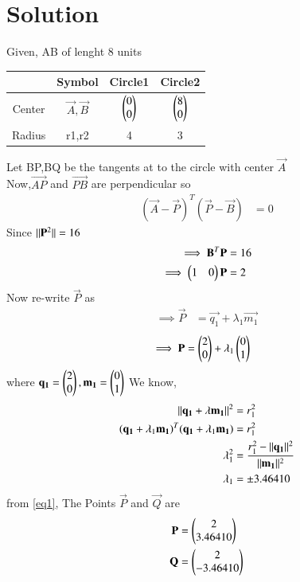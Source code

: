 \documentclass[journal,12pt,twocolumn]{IEEEtran}
\begin{document}
\section*{Solution}
Given, AB of lenght 8 units 
\begin{center}
\begin{tabular}{|c|c|c|c|}
  \hline
  & Symbol & Circle1 & Circle2 \\
  \hline
  Center & $\Vec{A},\Vec{B}$ & $\begin{pmatrix}0\\0\end{pmatrix}$ & $\begin{pmatrix}8\\0\end{pmatrix}$ \\ 
  \hline
  Radius & r1,r2 & 4 & 3 \\ 
  \hline
\end{tabular}
\end{center}
Let BP,BQ be the tangents at to the circle with center $\Vec{A}$\\
Now,$\Vec{AP}$ and $\vec{PB}$ are perpendicular so
\begin{align}
    (\vec{A}-\vec{P})^T (\vec{P}-\vec{B}) &= 0
\end{align}
Since $\lVert\mathbf{P}^2\rVert=16$
\begin{align}
    \implies \mathbf{B}^T \mathbf{P} &= 16\\
    \implies \begin{pmatrix}1&0\end{pmatrix} \mathbf{P} &= 2
\end{align}
Now re-write $\vec{P}$ as
\begin{align}
    \implies \Vec{P} &=\vec{q_1}+\lambda_1\vec{m_1}
\end{align}
\begin{align}
    \implies \mathbf{P} &= \begin{pmatrix}2\\0\end{pmatrix} + \lambda_1 \begin{pmatrix}0\\1\end{pmatrix} \label{eq1}
\end{align}
where $\mathbf{q_1}=\begin{pmatrix}2\\ 0\end{pmatrix},\mathbf{m_1}=\begin{pmatrix}0\\1\end{pmatrix}$
We know,
\begin{align}
    \lVert\mathbf{q_1}+\lambda\mathbf{m_1}\rVert^2&=r_1^2\\
    (\mathbf{q_1}+\lambda_1\mathbf{m_1})^T(\mathbf{q_1}+\lambda_1 \mathbf{m_1})&=r_1^2\\
    \lambda_1^2&=\frac{r_1^2-\lVert\mathbf{q_1}\rVert^2}{\lVert\mathbf{m_1}\rVert^2}\\
    \lambda_1 &= \pm 3.46410
\end{align}
from \eqref{eq1}, The Points $\vec{P}$ and $\vec{Q}$ are
\begin{align}
    \mathbf{P}&=\begin{pmatrix}2\\3.46410\end{pmatrix}\\
    \mathbf{Q}&=\begin{pmatrix}2\\-3.46410\end{pmatrix}
\end{align}
\end{document}
